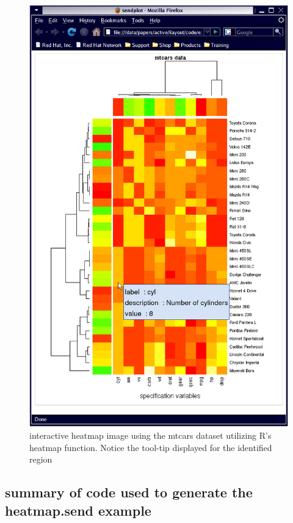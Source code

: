 \documentclass[]{article}
\begin{document}
\begin{center}
\begin{figure}
\includegraphics{iExHeat}
\caption{interactive heatmap image using the mtcars dataset utilizing R's heatmap function. Notice the tool-tip displayed for the identified region }
\end{figure}
\end{center}

\subsection{summary of code used to generate the heatmap.send example}
\end{document}
